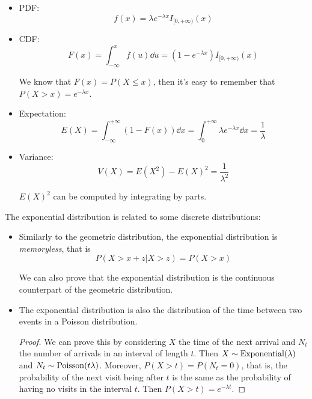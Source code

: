 \documentclass[12pt]{extarticle}
\newcommand{\Poisson}{{\operatorfont Poisson}}
\newcommand{\Exponential}{{\operatorfont Exponential}}
\begin{document}
\begin{itemize}
    \item PDF:
          \begin{equation}
              f(x) = \lambda e^{-\lambda x} I_{[0, +\infty)}(x)
          \end{equation}
    \item CDF:
          \begin{equation}
              F(x) = \int_{-\infty}^x f(u) \dd{u} = (1 - e^{-\lambda x})I_{[0, +\infty)}(x)
          \end{equation}

          We know that $F(x) = P(X \leq x)$, then it's easy to remember that $P(X > x) = e^{-\lambda x}$.
    \item Expectation:
          \begin{equation}
              E(X) = \int_{-\infty}^{+\infty} (1 - F(x)) \dd{x} = \int_0^{+\infty} \lambda e^{-\lambda x} \dd{x} = \frac{1}{\lambda}
          \end{equation}
    \item Variance:
          \begin{equation}
              V(X) = E(X^2) - E(X)^2 = \frac{1}{\lambda^2}
          \end{equation}

          $E(X)^2$ can be computed by integrating by parts.
\end{itemize}

The exponential distribution is related to some discrete distributions:
\begin{itemize}
    \item Similarly to the geometric distribution, the exponential distribution is \emph{memoryless}, that is
          \begin{equation}
              P(X > x + z | X > z) = P(X > x)
          \end{equation}

          We can also prove that the exponential distribution is the continuous counterpart of the geometric distribution.

    \item
          The exponential distribution is also the distribution of the time between two events in a Poisson distribution.

          \begin{proof}
              We can prove this by considering $X$ the time of the next arrival and $N_t$ the number of arrivals in an interval of length $t$.
              Then $X \sim \Exponential(\lambda)$ and $N_t \sim \Poisson(t \lambda)$.
              Moreover, $P(X > t) = P(N_t = 0)$, that is, the probability of the next visit being after $t$ is the same as the probability of having no visits in the interval $t$.
              Then $P(X > t) = e^{-\lambda t}$.
          \end{proof}
\end{itemize}
\end{document}
